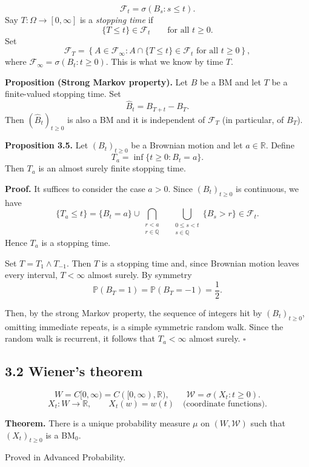 \documentclass[11pt,a4paper]{article}
\begin{document}
\medskip

\[
\mathcal F_t=\sigma(B_s:s\leq t).
\]
Say $T:\Omega\longrightarrow[0,\infty]$ is a \emph{stopping time}
if
\[
\{T\leq t\}\in\mathcal F_t
\qquad\text{for all }t\geq0.
\]
Set
\[
\mathcal F_T
=\left\{
A\in\mathcal F_\infty:
A\cap\{T\leq t\}\in\mathcal F_t
\text{ for all }t\geq0
\right\},
\]
where $\mathcal F_\infty=\sigma(B_t:t\geq0)$.
This is what we know by time $T$.

\medskip
\noindent\textbf{Proposition (Strong Markov property).}
Let $B$ be a BM and let $T$ be a finite-valued stopping time.
Set
\[
\widehat B_t=B_{T+t}-B_T.
\]
Then $(\widehat B_t)_{t\geq0}$ is also a BM and it is independent
of $\mathcal F_T$ (in particular, of $B_T$).

\medskip
\noindent\textbf{Proposition 3.5.}
Let $(B_t)_{t\geq0}$ be a Brownian motion and let $a\in\mathbb R$.
Define
\[
T_a=\inf\{t\geq0:B_t=a\}.
\]
Then $T_a$ is an almost surely finite stopping time.

\noindent\textbf{Proof.}
It suffices to consider the case $a>0$.
Since $(B_t)_{t\geq0}$ is continuous, we have
\[
\{T_a\leq t\}
=\{B_t=a\}
\cup\bigcap_{\substack{r<a\\r\in\mathbb Q}}
\quad\bigcup_{\substack{0\leq s<t\\s\in\mathbb Q}}
\{B_s>r\}
\in\mathcal F_t.
\]
Hence $T_a$ is a stopping time.

Set $T=T_1\wedge T_{-1}$. Then $T$ is a stopping time and, since
Brownian motion leaves every interval, $T<\infty$ almost surely.
By symmetry
\[
\mathbb P(B_T=1)=\mathbb P(B_T=-1)=\frac12.
\]

Then, by the strong Markov property, the sequence of integers hit by
$(B_t)_{t\geq0}$, omitting immediate repeats, is a simple symmetric
random walk. Since the random walk is recurrent, it follows that
$T_a<\infty$ almost surely.
\hfill$\square$

\subsection*{3.2 Wiener's theorem}

\[
W=C[0,\infty)=C([0,\infty),\mathbb R),
\qquad
\mathcal W=\sigma(X_t:t\geq0).
\]
\[
X_t:W\longrightarrow\mathbb R,\qquad X_t(w)=w(t)
\quad\text{(coordinate functions)}.
\]

\medskip
\noindent\textbf{Theorem.}
There is a unique probability measure $\mu$ on $(W,\mathcal W)$
such that $(X_t)_{t\geq0}$ is a BM$_0$.

Proved in Advanced Probability.
\end{document}
